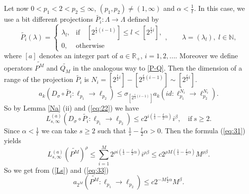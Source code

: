 \documentclass[12pt]{article}
\newcommand{\R}{{\mathbb R}}
\newcommand{\N}{{\mathbb N}}
\begin{document}
Let now  $0< p_1< 2< p_2\leq\infty$, $(p_1,p_2)\neq (1,\infty)$ and $\alpha<\frac 1 t.$ In this case, we use a bit different  projections  $\widetilde{P_i}:\Lambda\rightarrow\Lambda$  defined   by
\begin{displaymath}
	\widetilde{P_i}(\lambda)=
	\left\{ \begin{array}{ll} \lambda_l, & {\mathrm{if}\quad [2^{\frac t 2 (i-1)}]\leq l <[2^{\frac t 2 i}],} \\ 0, &{\mathrm{otherwise}}\end{array}\right.
	, \qquad %
	\lambda=(\lambda_l), \;l\in\N, 
\end{displaymath}
where $[a]$ denotes an integer part of $a\in \R_+$, $i=1,2,...$.  Moreover we define  operators $\widetilde{P^M}$ and  $\widetilde{Q_M}$ in the analogous way to \eqref{P-Q}. 
Then the dimension of a range of the projection $\widetilde{P_i}$ is   $N_i = [2^{\frac t 2 i}]-[2^{\frac t 2 (i-1)}]\sim [2^{\frac t 2 i}]$. 
\begin{equation}\label{eq:22}
	a_k(D_\sigma \circ 	\widetilde{P_i}: \ell_{p_1}\rightarrow \ell_{p_2})\leq \sigma_{ [2^{\frac t 2 (i-1)}]}a_k(id:\ell_{p_1}^{N_i}\rightarrow \ell_{p_2}^{N_i}).
\end{equation}
So by Lemma \ref{Na} (ii) and (\ref{eq:22}) we have
\begin{equation}
	L_{s,\infty}^{(a)}(D_\sigma\circ 	\widetilde{P_i}: \ell_{p_1}\rightarrow \ell_{p_2})\leq c  2^{ i (\frac 1 s-\frac t 2\alpha)}i^\beta, \quad\mathrm{if}\ s\geq 2.
	\label{eq:31}
\end{equation}
Since $\alpha<\frac 1 t $ we can take $s\geq 2$ such that $\frac 1 s-\frac t 2\alpha>0$. Then the formula (\ref{eq:31}) yields
\begin{equation}
	L_{s,\infty}^{(a)}(\widetilde{P^M})^\rho\leq \sum_{i=1}^{M} 2^{\rho i(\frac{1}{s}-\frac{t}{2}\alpha)}i^{\rho\beta}\leq c2^{\rho M(\frac{1}{s} -\frac{t}{2}\alpha)}M^{\rho\beta}.
	\label{eq:33}
\end{equation}
So we get from (\ref{Ls}) and (\ref{eq:33})
\begin{equation}
	a_{2^M}(\widetilde{P^M}:\ell_{p_1}\rightarrow \ell_{p_2})\leq c 2^{ -M\frac t 2\alpha }M^\beta.
	\label{eq:34}
\end{equation}
\end{document}
